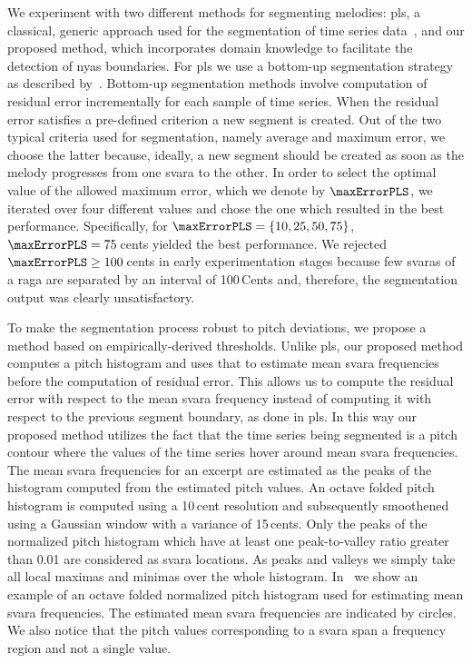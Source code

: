 {We experiment with two different methods for segmenting melodies: \gls{pls}, a classical, generic approach used for the segmentation of time series data~\citep{keogh2004segmenting}, and our proposed method, which incorporates domain knowledge to facilitate the detection of \gls{nyas} boundaries. For \gls{pls} we use a bottom-up segmentation strategy as described by~\cite{keogh2004segmenting}. Bottom-up segmentation methods involve computation of residual error incrementally for each sample of time series. When the residual error satisfies a pre-defined criterion a new segment is created. Out of the two typical criteria used for segmentation, namely average and maximum error, we choose the latter because, ideally, a new segment should be created as soon as the melody progresses from one \gls{svara} to the other. In order to select the optimal value of the allowed maximum error, which we denote by $\maxErrorPLS$, we iterated over four different values and chose the one which resulted in the best performance. Specifically, for $\maxErrorPLS=\lbrace 10, 25, 50, 75\rbrace$, $\maxErrorPLS=75$\,cents yielded the best performance. We rejected $\maxErrorPLS\geq 100$\,cents in early experimentation stages because few \glspl{svara} of a \gls{raga} are separated by an interval of 100\,Cents and, therefore, the segmentation output was clearly unsatisfactory.

To make the segmentation process robust to pitch deviations, we propose a method based on empirically-derived thresholds. Unlike \gls{pls}, our proposed method computes a pitch histogram and uses that to estimate mean \gls{svara} frequencies before the computation of residual error. This allows us to compute the residual error with respect to the mean \gls{svara} frequency instead of computing it with respect to the previous segment boundary, as done in \gls{pls}. In this way our proposed method utilizes the fact that the time series being segmented is a pitch contour where the values of the time series hover around mean \gls{svara} frequencies. The mean \gls{svara} frequencies for an excerpt are estimated as the peaks of the histogram computed from the estimated pitch values. An octave folded pitch histogram is computed using a 10\,cent resolution and subsequently smoothened using a Gaussian window with a variance of 15\,cents. Only the peaks of the normalized pitch histogram which have at least one peak-to-valley ratio greater than 0.01 are considered as \gls{svara} locations. As peaks and valleys we simply take all local maximas and minimas over the whole histogram. In~ we show an example of an octave folded normalized pitch histogram used for estimating mean \gls{svara} frequencies. The estimated mean \gls{svara} frequencies are indicated by circles. We also notice that the pitch values corresponding to a \gls{svara} span a frequency region and not a single value.


}

